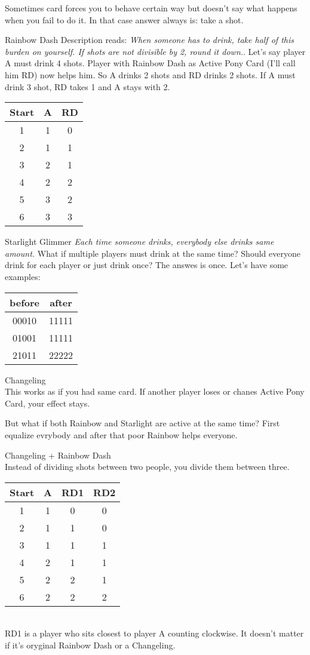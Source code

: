 \documentclass[notitlepage]{article}
\begin{document}
Sometimes card forces you to behave certain way but doesn't say what happens when you fail to do it. In that case answer always is: take a shot.

Rainbow Dash\newline
Description reads: \textsl{When someone has to drink, take half of this burden on yourself. If shots are not divisible by 2, round it down.}. 
Let's say player A must drink 4 shots. Player with Rainbow Dash as Active Pony Card (I'll call him RD) now helps him. So A drinks 2 shots and RD drinks 2 shots. If A must drink 3 shot, RD takes 1 and A stays with 2. \\
\begin{tabular}{| c | c | c |}
\hline
Start & A & RD \\ \hline
1 & 1 & 0 \\ \hline
2 & 1 & 1 \\ \hline
3 & 2 & 1 \\ \hline
4 & 2 & 2 \\ \hline
5 & 3 & 2 \\ \hline
6 & 3 & 3 \\ \hline
\end{tabular}

Starlight Glimmer\newline
\textsl{Each time someone drinks, everybody else drinks same amount.} What if multiple players must drink at the same time? Should everyone drink for each player or just drink once? The answes is once. Let's have some examples: \\
\begin{tabular}{|c|c|}
\hline
before & after \\ \hline
00010 & 11111 \\ \hline
01001 & 11111 \\ \hline
21011 & 22222 \\ \hline
\end{tabular}
Changeling\\
This works as if you had same card. If another player loses or chanes Active Pony Card, your effect stays.

But what if both Rainbow and Starlight are active at the same time? First equalize evrybody and after that poor Rainbow helps everyone.

Changeling + Rainbow Dash\\
Instead of dividing shots between two people, you divide them between three.
\begin{tabular}{| c | c | c | c |}
\hline
Start & A & RD1 & RD2 \\ \hline
1 & 1 & 0 & 0 \\ \hline
2 & 1 & 1 & 0 \\ \hline
3 & 1 & 1 & 1 \\ \hline
4 & 2 & 1 & 1 \\ \hline
5 & 2 & 2 & 1 \\ \hline
6 & 2 & 2 & 2 \\ \hline
\end{tabular}\\
RD1 is a player who sits closest to player A counting clockwise. It doesn't matter if it's oryginal Rainbow Dash or a Changeling.
\end{document}
